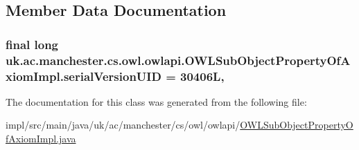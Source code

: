 \subsection{Member Data Documentation}
\hypertarget{classuk_1_1ac_1_1manchester_1_1cs_1_1owl_1_1owlapi_1_1_o_w_l_sub_object_property_of_axiom_impl_a6d8341561bca81b220c4d13d3f30022f}{
\subsubsection[{serial\-Version\-U\-I\-D}]{\setlength{\rightskip}{0pt plus 5cm}final long uk.\-ac.\-manchester.\-cs.\-owl.\-owlapi.\-O\-W\-L\-Sub\-Object\-Property\-Of\-Axiom\-Impl.\-serial\-Version\-U\-I\-D = 30406\-L\hspace{0.3cm}{\ttfamily [static]}, {\ttfamily [private]}}}\label{classuk_1_1ac_1_1manchester_1_1cs_1_1owl_1_1owlapi_1_1_o_w_l_sub_object_property_of_axiom_impl_a6d8341561bca81b220c4d13d3f30022f}


The documentation for this class was generated from the following file\-:\begin{DoxyCompactItemize}
\item 
impl/src/main/java/uk/ac/manchester/cs/owl/owlapi/\hyperlink{_o_w_l_sub_object_property_of_axiom_impl_8java}{O\-W\-L\-Sub\-Object\-Property\-Of\-Axiom\-Impl.\-java}\end{DoxyCompactItemize}

